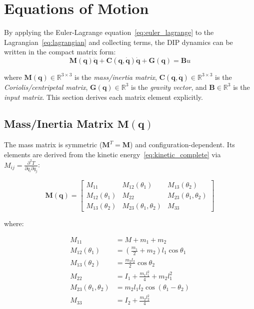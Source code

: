 \section{Equations of Motion}
\label{sec:equations_of_motion}

By applying the Euler-Lagrange equation~\eqref{eq:euler_lagrange} to the Lagrangian~\eqref{eq:lagrangian} and collecting terms, the DIP dynamics can be written in the compact matrix form:
\begin{equation}
\mathbf{M}(\mathbf{q})\ddot{\mathbf{q}} + \mathbf{C}(\mathbf{q}, \dot{\mathbf{q}})\dot{\mathbf{q}} + \mathbf{G}(\mathbf{q}) = \mathbf{B}u
\label{eq:eom_matrix_form}
\end{equation}

where $\mathbf{M}(\mathbf{q}) \in \mathbb{R}^{3 \times 3}$ is the \textit{mass/inertia matrix}, $\mathbf{C}(\mathbf{q}, \dot{\mathbf{q}}) \in \mathbb{R}^{3 \times 3}$ is the \textit{Coriolis/centripetal matrix}, $\mathbf{G}(\mathbf{q}) \in \mathbb{R}^3$ is the \textit{gravity vector}, and $\mathbf{B} \in \mathbb{R}^3$ is the \textit{input matrix}. This section derives each matrix element explicitly.

\subsection{Mass/Inertia Matrix $\mathbf{M}(\mathbf{q})$}

The mass matrix is symmetric ($\mathbf{M}^T = \mathbf{M}$) and configuration-dependent. Its elements are derived from the kinetic energy~\eqref{eq:kinetic_complete} via $M_{ij} = \frac{\partial^2 T}{\partial \dot{q}_i \partial \dot{q}_j}$:

\begin{equation}
\mathbf{M}(\mathbf{q}) = \begin{bmatrix}
M_{11} & M_{12}(\theta_1) & M_{13}(\theta_2) \\
M_{12}(\theta_1) & M_{22} & M_{23}(\theta_1, \theta_2) \\
M_{13}(\theta_2) & M_{23}(\theta_1, \theta_2) & M_{33}
\end{bmatrix}
\label{eq:mass_matrix}
\end{equation}

where:

\begin{align}
M_{11} &= M + m_1 + m_2 \label{eq:M11} \\
M_{12}(\theta_1) &= \left(\frac{m_1}{2} + m_2\right) l_1 \cos\theta_1 \label{eq:M12} \\
M_{13}(\theta_2) &= \frac{m_2 l_2}{2}\cos\theta_2 \label{eq:M13} \\
M_{22} &= I_1 + \frac{m_1 l_1^2}{4} + m_2 l_1^2 \label{eq:M22} \\
M_{23}(\theta_1, \theta_2) &= m_2 l_1 l_2 \cos(\theta_1 - \theta_2) \label{eq:M23} \\
M_{33} &= I_2 + \frac{m_2 l_2^2}{4} \label{eq:M33}
\end{align}

